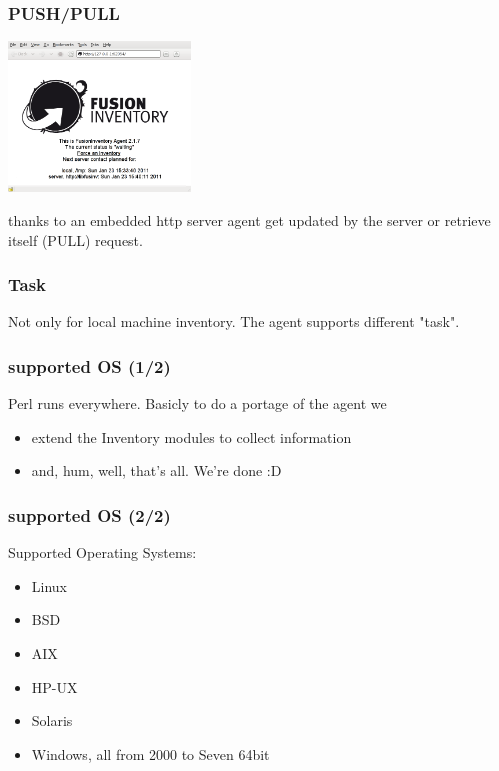 \begin{frame}
    \frametitle{PUSH/PULL}
    \includegraphics[height=4.0cm]{pics/http-server.png}

    thanks to an embedded http server agent get updated by the server or retrieve itself (PULL) request.
\end{frame}

\begin{frame}
    \frametitle{Task}
    Not only for local machine inventory. The agent supports different "task".
\end{frame}

\begin{frame}
    \frametitle{supported OS (1/2)}
    Perl runs everywhere.
    \pause
    Basicly to do a portage of the agent we
    \begin{itemize}
        \item extend the Inventory modules to collect information
        \item and, hum, well, that's all. We're done :D
    \end{itemize}
\end{frame}

\begin{frame}
    \frametitle{supported OS (2/2)}
    Supported Operating Systems:
    \begin{itemize}
        \item<2-> Linux
        \item<3-> BSD
        \item<4-> AIX
        \item<5-> HP-UX
        \item<6-> Solaris
        \item<7-> Windows, all from 2000 to Seven 64bit
    \end{itemize}
\end{frame}
 
